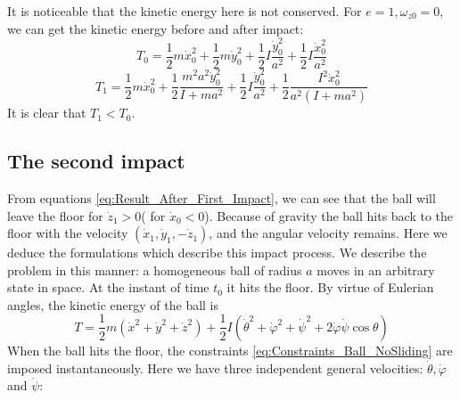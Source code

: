\documentclass[preprint,12pt]{elsarticle}
\begin{document}
It is noticeable that the kinetic energy here is not conserved.
For $e=1,\omega_{z0}=0$, we can get the kinetic energy before and after impact:
\begin{equation}
T_0=\frac{1}{2}m\dot{x}_0^2+\frac{1}{2}m\dot{y}_0^2+\frac{1}{2}I\frac{\dot{y}_0^2}{a^2}+\frac{1}{2}I\frac{\dot{x}_0^2}{a^2}
\end{equation}
\begin{equation}
T_1=\frac{1}{2}m \dot{x}_0^2+\frac{1}{2}\frac{m^2a^2\dot{y}_0^2}{I+ma^2}+\frac{1}{2}I\frac{\dot{y}_0^2}{a^2}+\frac{1}{2}\frac{I^2 \dot{x}_0^2}{a^2\left(I+ma^2\right)}
\end{equation}
It is clear that $T_1<T_0$.

\subsection{The second impact}
From equations \eqref{eq:Result_After_First_Impact}, we can see that the ball will leave the floor for $\dot{z}_1>0$( for  $\dot{x}_0<0$). Because of gravity the ball hits back to the floor with the velocity $(\dot{x}_1,\dot{y}_1,-\dot{z}_1)$, and the angular velocity remains.
Here we deduce the formulations which describe this impact process.
We describe the problem in this manner: a homogeneous ball of radius $a$ moves in an arbitrary state in space. At the instant of time $t_0$ it hits the floor.
By virtue of Eulerian angles, the kinetic energy of the ball is
\begin{equation}
  T=\frac{1}{2}m\left(\dot{x}^2+\dot{y}^2+\dot{z}^2\right)+\frac{1}{2}I\left(\dot{\theta}^2+\dot{\varphi}^2+\dot{\psi}^2+2\dot{\varphi}\dot{\psi}\cos \theta\right)
\end{equation}
When the ball hits the floor, the constraints \eqref{eq:Constraints_Ball_NoSliding} are imposed instantaneously. Here we have three independent general velocities: $\dot{\theta},\dot{\varphi}$ and $\dot{\psi}$:
\end{document}
